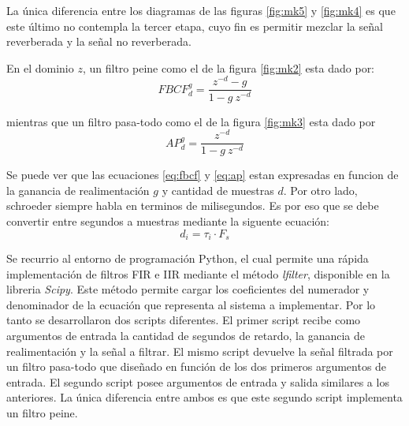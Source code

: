 \documentclass[]{article}
\begin{document}
\begin{multicols}{2}
La única diferencia entre los diagramas de las figuras \ref{fig:mk5} y \ref{fig:mk4}
es que este último no contempla la tercer etapa, cuyo fin es permitir mezclar la
señal reverberada y la señal no reverberada.

En el dominio $z$, un filtro peine como el de la figura \ref{fig:mk2} esta dado por:
\begin{equation}
  FBCF_{d}^g=\frac{z^{-d}-g}{1-g\:z^{-d}}
  \label{eq:fbcf}
\end{equation}

mientras que un filtro pasa-todo como el de la figura \ref{fig:mk3} esta dado
por \begin{equation}
  AP_{d}^g=\frac{z^{-d}}{1-g\:z^{-d}}
  \label{eq:ap}
\end{equation}

Se puede ver que las ecuaciones \eqref{eq:fbcf} y \eqref{eq:ap} estan expresadas
en funcion de la ganancia de realimentación $g$ y cantidad de muestras $d$.
Por otro lado, schroeder siempre habla en terminos de
milisegundos. Es por eso que se debe convertir entre segundos a muestras mediante
la siguente ecuación:
\begin{equation}
d_i=\tau_i \cdot F_s
\end{equation}

Se recurrio al entorno de programación Python, el cual permite una rápida
implementación de filtros FIR e IIR mediante el método \emph{lfilter}, disponible
en la libreria \emph{Scipy}. Este método permite cargar los coeficientes del numerador
y denominador de la ecuación que representa al sistema a implementar. Por lo tanto
se desarrollaron dos scripts diferentes. El primer script recibe como argumentos de entrada
la cantidad de segundos de retardo, la ganancia de realimentación y la señal a
filtrar. El mismo script devuelve la señal filtrada por un filtro pasa-todo que
diseñado en función de los dos primeros argumentos de entrada. El segundo script
posee argumentos de entrada y salida similares a los anteriores. La única diferencia
entre ambos es que este segundo script implementa un filtro peine.



\printbibliography
\end{multicols}
\end{document}
